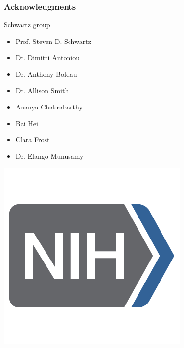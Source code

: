 \documentclass{beamer}
\begin{document}
\begin{frame}
\frametitle{Acknowledgments}
\begin{block}{Schwartz group}
\begin{itemize}
    \item Prof. Steven D. Schwartz
    \item Dr. Dimitri Antoniou
    \item Dr. Anthony Boldau
    \item Dr. Allison Smith
    \item Ananya Chakraborthy
    \item Bai Hei
    \item Clara Frost
    \item Dr. Elango Munusamy
\end{itemize}
\end{block}
\pause
\includegraphics[scale=0.1]{figures/nih-logo.png}
\end{frame}
%
%
%
%
\end{document}
